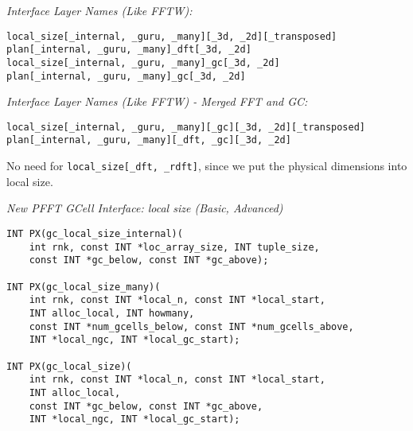 \emph{Interface Layer Names (Like FFTW):}
\begin{lstlisting}
local_size[_internal, _guru, _many][_3d, _2d][_transposed]
plan[_internal, _guru, _many]_dft[_3d, _2d]
local_size[_internal, _guru, _many]_gc[_3d, _2d]
plan[_internal, _guru, _many]_gc[_3d, _2d]
\end{lstlisting}

\emph{Interface Layer Names (Like FFTW) - Merged FFT and GC:}
\begin{lstlisting}
local_size[_internal, _guru, _many][_gc][_3d, _2d][_transposed]
plan[_internal, _guru, _many][_dft, _gc][_3d, _2d]
\end{lstlisting}
No need for \lstinline{local_size[_dft, _rdft]}, since we put the physical dimensions into local size.

\newpage
\emph{New PFFT GCell Interface: local size (Basic, Advanced)}
\begin{lstlisting}
INT PX(gc_local_size_internal)(
    int rnk, const INT *loc_array_size, INT tuple_size,
    const INT *gc_below, const INT *gc_above);

INT PX(gc_local_size_many)(
    int rnk, const INT *local_n, const INT *local_start,
    INT alloc_local, INT howmany,
    const INT *num_gcells_below, const INT *num_gcells_above,
    INT *local_ngc, INT *local_gc_start);

INT PX(gc_local_size)(
    int rnk, const INT *local_n, const INT *local_start,
    INT alloc_local,
    const INT *gc_below, const INT *gc_above,
    INT *local_ngc, INT *local_gc_start);
\end{lstlisting}


